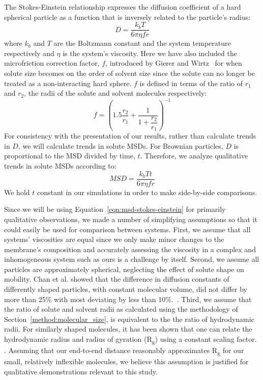 \documentclass[journal=jpcbfk,manuscript=article]{achemso}
\begin{document}
  The Stokes-Einstein relationship expresses the diffusion coefficient of 
  a hard spherical particle as a function that is inversely related to the
  particle's radius:
  \begin{equation}
  D = \dfrac{k_bT}{6\pi\eta fr}
  \label{eqn:stokes-einstein}
  \end{equation}
  where $k_b$ and $T$ are the Boltzmann	constant and the system temperature
  respectively and $\eta$ is the system's viscosity. Here we have also 
  included the microfriction correction factor, $f$, introduced by 
  Gierer and Wirtz~\cite{gierer_molekulare_1953,chen_diffusion_1984} for when
  solute size becomes on the order of solvent size since the solute can no 
  longer be treated as a non-interacting hard sphere. $f$ is defined in terms
  of the ratio of $r_1$ and $r_2$, the radii of the solute and solvent molecules
  respectively:
  \begin{equation}
  f = \left(1.5\dfrac{r_2}{r_1} + \dfrac{1}{1 + \dfrac{r_2}{r_1}}\right)^{-1}
  \label{eqn:correction_factor}
  \end{equation}
  For consistency with the presentation of our results, rather than calculate 
  trends in $D$, we will calculate trends in solute MSDs. For Brownian
  particles, $D$ is proportional to the MSD divided by time, $t$. Therefore, 
  we analyze qualitative trends in solute MSDs according to:
  \begin{equation}
  MSD = \dfrac{k_bTt}{6\pi\eta fr}
  \label{eqn:msd-stokes-einstein}
  \end{equation}
  We hold $t$ constant in our simulations in order to make side-by-side comparisons. 
  
  Since we will be using Equation~\ref{eqn:msd-stokes-einstein} for primarily qualitative observations, 
  we made a number of simplifying assumptions so that it could easily be used for 
  comparison between systems. First, we assume that all systems' viscosities
  are equal since we only make minor changes to the membrane's composition and
  accurately assessing the viscosity in a complex and inhomogeneous system such 
  as ours is a challenge by itself. Second, we assume all particles are approximately
  spherical, neglecting the effect of solute shape on mobility. Chan et al. 
  showed that the difference in diffusion constants of differently shaped 
  particles, with constant molecular volume, did not differ by more than 25\%
  with most deviating by less than 10\%.~\cite{chan_effects_2015}. 
  Third, we assume that the ratio of solute and solvent radii as calculated using the
  methodology of Section~\ref{method:molecular_size}, is equivalent to the the 
  ratio of hydrodynamic radii. For similarly shaped molecules, it has been shown that
  one can relate the hydrodynamic radius and radius of gyration (R\textsubscript{g})
  using a constant scaling factor. \cite{lee_molecular_2008,he_novel_2003,li_critical_2009}.
  Assuming that our end-to-end distance reasonably approximates R\textsubscript{g} 
  for our small, relatively inflexible molecules, we believe this assumption is 
  justified for qualitative demonstrations relevant to this study. 
  
\end{document}
